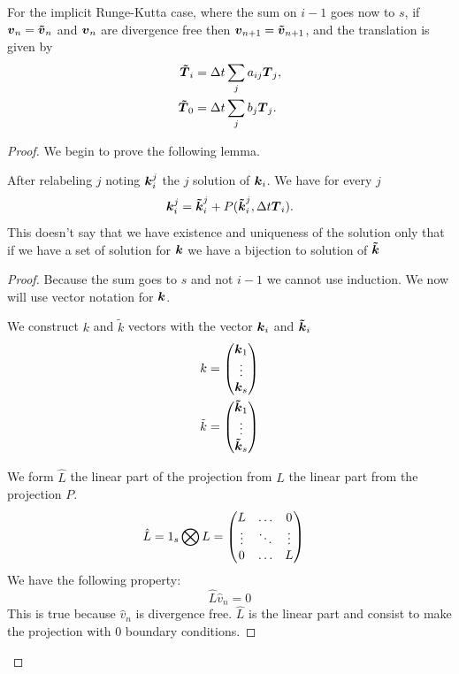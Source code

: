 \begin{theorem}
For the implicit Runge-Kutta case, where the sum on $i-1$ goes now to $s$,
if ${\boldsymbol {v}}_{n}={\boldsymbol {\tilde{v}}}_{n}$ and ${\boldsymbol {v}}_n$ are divergence free then ${\boldsymbol {v}}_{n+1}={\boldsymbol {\tilde{v}}}_{n+1}$,
and the translation is given by
\begin{align}
  {\boldsymbol {\tilde{T}}}_{i}&=\Delta t\sum_{j}a_{ij}{\boldsymbol {T}}_{j},\\
  {\boldsymbol {\tilde{T}}}_{0}&=\Delta t\sum_{j}b_{j}{\boldsymbol {T}}_{j}.
\end{align}

\end{theorem}
\begin{proof}
We begin to prove the following lemma.
\begin{lemma}
After relabeling $j$ noting ${\boldsymbol {k}}_{i}^{j}$ the $j$ solution of ${\boldsymbol {k}}_{i}$.
We have for every $j$
\begin{equation}
  {\boldsymbol {k}}_{i}^{j}={\boldsymbol {\tilde{k}}}_{i}^{j}+P({\boldsymbol {\tilde{k}}}_{i}^{j},\Delta t {\boldsymbol {T}}_{i}).
\end{equation}
This doesn't say that we have existence and uniqueness of the solution only that if we have a set of solution for ${\boldsymbol {k}}$ we have a bijection
to solution of ${\boldsymbol {\tilde{k}}}$
\end{lemma}
\begin{proof}
Because the sum goes to $s$ and not $i-1$ we cannot use induction.
We now will use vector notation for ${\boldsymbol {k}}$.

We construct $k$ and $\tilde{k}$ vectors with the vector ${\boldsymbol {k}}_{i}$ and ${\boldsymbol {\tilde{k}}}_{i}$
\begin{align}
k&=\begin{pmatrix}
    {\boldsymbol {k}}_{1}\\
    \vdots\\
    {\boldsymbol {k}}_{s}\\
  \end{pmatrix}\\
\tilde{k}&=\begin{pmatrix}
    {\boldsymbol {\tilde{k}}}_{1}\\
    \vdots\\
    {\boldsymbol {\tilde{k}}}_{s}\\
  \end{pmatrix}
\end{align}

We form $\hat{L}$ the linear part of the projection from $L$ the linear part from the projection $P$.
\begin{align}
\hat{L}&=1_{s}\bigotimes L=\begin{pmatrix}L	&\ldots	&0\\
			\vdots &\ddots 	&\vdots\\
			0	&\ldots	&L\\
	\end{pmatrix}
\end{align}
We have the following property:
\begin{equation}
\hat{L}\hat{v}_{n}=0
\end{equation}
This is true because $\hat{v}_{n}$ is divergence free.
$\hat{L}$ is the linear part and consist to make the projection with 0 boundary conditions.


\end{proof}
\end{proof}
